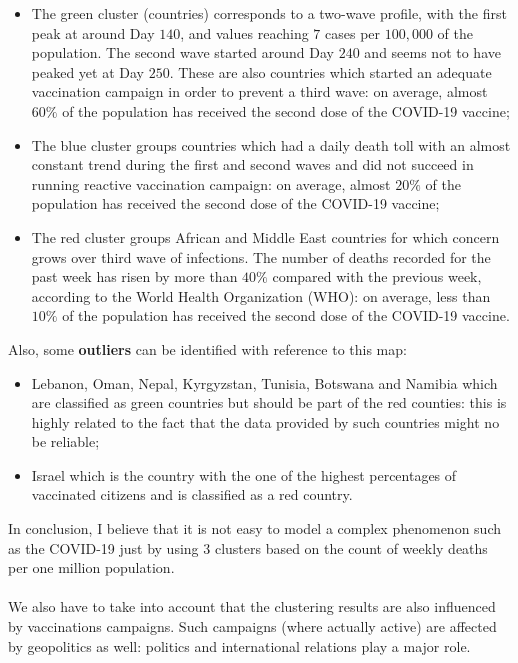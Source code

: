 \documentclass[11pt,a4paper]{article}
\begin{document}
\noindent
\begin{itemize}
    \item The {\color{ForestGreen}green cluster} (countries) corresponds to a
    two-wave profile, with the first peak at around Day $140$, and values
    reaching $7$ cases per $100,000$ of the population. The second wave started
    around Day $240$ and seems not to have peaked yet at Day $250$. These are
    also countries which started an adequate vaccination campaign in order to
    prevent a third wave: on average, almost $60\%$ of the population has
    received the second dose of the COVID-19 vaccine;
    \item The {\color{blue}blue cluster} groups countries which had a
    daily death toll with an almost constant trend during the first and second
    waves and did not succeed in running reactive vaccination campaign: on
    average, almost $20\%$ of the population has received the second dose of the
    COVID-19 vaccine;
    \item The {\color{red}red cluster} groups African and Middle East countries
    for which concern grows over third wave of infections. The number of deaths
    recorded for the past week has risen by more than $40\%$ compared with the
    previous week, according to the World Health Organization (WHO): on average,
    less than $10\%$ of the population has received the second dose of the
    COVID-19 vaccine.
\end{itemize}
Also, some \textbf{outliers} can be identified with reference to this map:
\begin{itemize}
    \item Lebanon, Oman, Nepal, Kyrgyzstan, Tunisia, Botswana and Namibia which
    are classified as {\color{ForestGreen}green countries} but should be part
    of the {\color{red}red counties}: this is highly related to the fact that
    the data provided by such countries might no be reliable;
    \item Israel which is the country with the one of the highest percentages
    of vaccinated citizens and is classified as a {\color{red}red country}.
\end{itemize}
In conclusion, I believe that it is not easy to model a complex phenomenon such
as the COVID-19 just by using $3$ clusters based on the count of weekly deaths
per one million population.\\
\\
We also have to take into account that the clustering results are also
influenced by vaccinations campaigns. Such campaigns (where actually active) are
affected by geopolitics as well: politics and international relations play a
major role.
\end{document}
